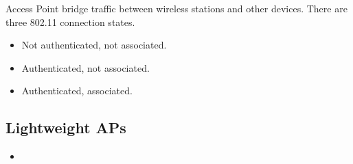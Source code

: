\documentclass{report}
\begin{document}
	Access Point bridge traffic between wireless stations and other devices. There
	are three 802.11 connection states.
	\begin{itemize}
		\item Not authenticated, not associated.

		\item Authenticated, not associated.

		\item Authenticated, associated.
	\end{itemize}

	\subsection{Lightweight APs}
	\begin{itemize}
		\item
	\end{itemize}
\end{document}
